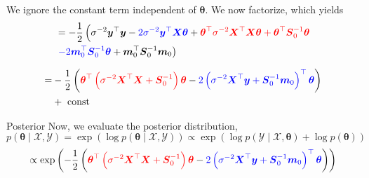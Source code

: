 \documentclass{beamer}
\begin{document}
\begin{frame}
We ignore the constant term independent of $\boldsymbol{\theta}$. We now factorize, which yields
\pause $$
\begin{aligned}
& = -\frac{1}{2}\left(\sigma^{-2} \boldsymbol{y}^{\top} \boldsymbol{y}-\textcolor{blue}{2 \sigma^{-2} \boldsymbol{y}^{\top} \boldsymbol{X}\boldsymbol{\theta}}+\textcolor{red}{\boldsymbol{\theta}^{\top} \sigma^{-2} \boldsymbol{X}^{\top} \boldsymbol{X} \boldsymbol{\theta}+\boldsymbol{\theta}^{\top} \boldsymbol{S}_0^{-1} \boldsymbol{\theta}}\right. \\
& \left. \textcolor{blue}{-2\boldsymbol{m}_0^{\top} \boldsymbol{S}_0^{-1} \boldsymbol{\theta}}+\boldsymbol{m}_0^{\top} \boldsymbol{S}_0^{-1} \boldsymbol{m}_0\right) 
\end{aligned}
$$

\pause $$
\begin{aligned}
= & -\frac{1}{2}\left(\textcolor{red}{\boldsymbol{\theta}^{\top}\left(\sigma^{-2} \boldsymbol{X}^{\top} \boldsymbol{X}+\boldsymbol{S}_0^{-1}\right) \boldsymbol{\theta}}-\textcolor{blue}{2\left(\sigma^{-2} \boldsymbol{X}^{\top} \boldsymbol{y}+\boldsymbol{S}_0^{-1} \boldsymbol{m}_0\right)^{\top} \boldsymbol{\theta}}\right)\\
& +\text { const }
\end{aligned}
$$
\end{frame}
\begin{frame}{Posterior}
Now, we evaluate the posterior distribution, 
\begin{equation*}
    p(\boldsymbol{\theta} \mid \mathcal{X}, \mathcal{Y})=\exp (\log p(\boldsymbol{\theta} \mid \mathcal{X}, \mathcal{Y})) \propto \exp (\log p(\mathcal{Y} \mid \mathcal{X}, \boldsymbol{\theta})+\log p(\boldsymbol{\theta}))
\end{equation*}
\begin{equation*}
\propto \exp \left(-\frac{1}{2}\left(\textcolor{red}{\boldsymbol{\theta}^{\top}\left(\sigma^{-2} \boldsymbol{X}^{\top} \boldsymbol{X}+\boldsymbol{S}_0^{-1}\right) \boldsymbol{\theta}}-\textcolor{blue}{2\left(\sigma^{-2} \boldsymbol{X}^{\top} \boldsymbol{y}+\boldsymbol{S}_0^{-1} \boldsymbol{m}_0\right)^{\top} \boldsymbol{\theta}}\right)\right)
\end{equation*}

\end{frame}
\end{document}
